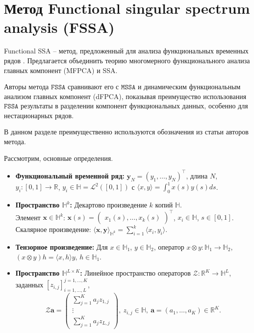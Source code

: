 \documentclass[12pt, specialist, subf
]{disser}
\theoremstyle{definition}
\newcommand{\MSSA}{\texttt{MSSA}}
\newcommand{\FSSA}{\texttt{FSSA}}
\begin{document}
\chapter{Метод Functional singular spectrum analysis (FSSA)}
\label{sec:fssa}

Functional SSA -- метод, предложенный для анализа функциональных временных рядов \cite{haghbin2019functionalsingularspectrumanalysis}. Предлагается объединить теорию многомерного функционального анализа главных компонент (MFPCA) и SSA.

Авторы метода $\FSSA$ сравнивают его с $\MSSA$ и динамическим функциональным анализом главных компонент (dFPCA), показывая преимущество использования $\FSSA$ результаты в разделении компонент функциональных данных, особенно для нестационарных рядов.

В данном разделе преимущественно используются обозначения из статьи \cite{haghbin2019functionalsingularspectrumanalysis} авторов метода.





Рассмотрим, основные определения.

\begin{itemize}
	\item \textbf{Функциональный временной ряд:} $\textbf{y}_N=(y_1,\ldots,y_N)^\top$, длина $N$, $y_i:[0,1]\to\mathbb{R}$, $y_i\in\mathbb{H}=\mathcal{L}^2([0,1])$ с $\langle x,y\rangle=\int_0^1 x(s)y(s)ds$.

	\item \textbf{Пространство $\mathbb{H}^k$:} Декартово произведение $k$ копий $\mathbb{H}$. \\ Элемент ${\pmb x}\in\mathbb{H}^k$: ${\pmb x}(s)=\begin{pmatrix} x_1(s),\ldots,x_k(s)\end{pmatrix}^\top$, $x_i\in\mathbb{H}$, $s\in[0,1]$. Скалярное произведение: $\langle\pmb x,\pmb y\rangle_{\mathbb{H}^k}=\sum_{i=1}^k\langle x_i,y_i\rangle$.

	\item \textbf{Тензорное произведение:} Для $x\in\mathbb{H}_1$, $y\in\mathbb{H}_2$, оператор $x\otimes y:\mathbb{H}_1\to\mathbb{H}_2$, $(x\otimes y)h=\langle x,h\rangle y$, $h\in\mathbb{H}_1$.

	\item \textbf{Пространство $\mathbb{H}^{L\times K}$:} Линейное пространство операторов $\mathcal{Z}:\mathbb{R}^K\to\mathbb{H}^L$, заданных $[z_{i,j}]_{i=1,\ldots,L}^{j=1,\ldots,K}$,
	      \begin{equation}\label{eq: z operator}
		      \mathcal{Z}\pmb{a}=\begin{pmatrix} \sum_{j=1}^K a_j z_{1,j} \\ \vdots \\ \sum_{j=1}^K a_j z_{L,j} \end{pmatrix}, \ z_{i,j}\in\mathbb{H}, \ \pmb{a}=(a_1,\ldots,a_K)\in\mathbb{R}^K.
	      \end{equation}

\end{itemize}
\end{document}
